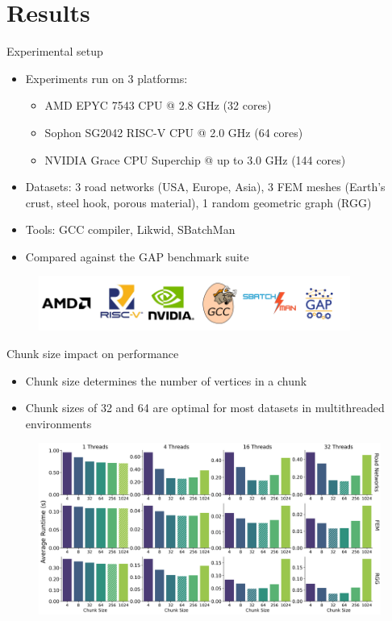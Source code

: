 \section{Results}
\begin{frame}{Experimental setup}
\begin{itemize}
  \item<1-> Experiments run on 3 platforms:
  \begin{itemize}
    \item AMD EPYC 7543 CPU @ 2.8 GHz (32 cores)
    \item Sophon SG2042 RISC-V CPU @ 2.0 GHz (64 cores)
    \item NVIDIA Grace CPU Superchip @ up to 3.0 GHz (144 cores)
  \end{itemize}
  \item<2-> Datasets: 3 road networks (USA, Europe, Asia), 3 FEM meshes (Earth's crust, steel hook, porous material), 1 random geometric graph (RGG)
  \item<3-> Tools: GCC compiler, Likwid, SBatchMan
  \item<4-> Compared against the GAP benchmark suite
\end{itemize}
\begin{figure}
  \centering
  \includegraphics[height=1.8cm]{images/tools.png}
\end{figure}
\end{frame}

\begin{frame}{Chunk size impact on performance}
\begin{itemize}
  \item Chunk size determines the number of vertices in a chunk
  \item Chunk sizes of 32 and 64 are optimal for most datasets in multithreaded environments
\end{itemize}
\begin{figure}
  \centering
  \includegraphics[width=0.8\linewidth]{images/pthreads_chunksize.png}
\end{figure}
\end{frame}

